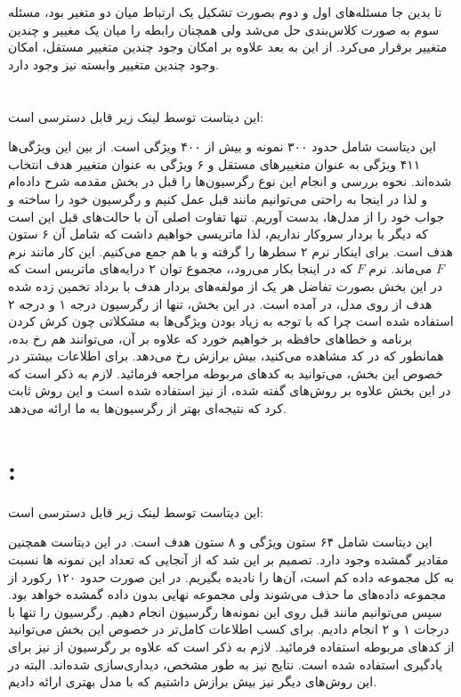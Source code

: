 \documentclass[a4paper, 12pt]{article}
\begin{document}
تا بدین جا مسئله‌های اول و دوم بصورت تشکیل یک ارتباط میان دو متغیر بود، مسئله سوم به صورت کلاس‌بندی حل می‌شد ولی همچنان رابطه را میان یک مغییر و چندین متغییر برقرار می‌کرد.  از این به بعد علاوه بر امکان وجود چندین متغییر مستقل، امکان وجود چندین متغییر وابسته نیز وجود دارد. 


\section{}
این دیتاست توسط لینک زیر قابل دسترسی است:
\begin{center}
	\href{https://www.kaggle.com/datasets/samanemami/airline-ticket-price-dataset-atp1d}{}
\end{center}

این دیتاست شامل حدود ۳۰۰ نمونه و بیش از ۴۰۰ ویژگی است. از بین این ویژگی‌ها ۴۱۱ ویژگی به عنوان متغییرهای مستقل و ۶ ویژگی به عنوان متغییر هدف انتخاب شده‌اند. 
نحوه بررسی و انجام این نوع رگرسیون‌ها را قبل در بخش مقدمه شرح داده‌ام و لذا در اینجا به راحتی می‌توانیم مانند قبل عمل کنیم و رگرسیون خود را ساخته و جواب خود را از مدل‌ها، بدست آوریم. تنها تفاوت اصلی آن با حالت‌های قبل این است که دیگر با بردار سروکار نداریم، لذا ماتریسی خواهیم داشت که شامل آن ۶ ستون هدف است. برای اینکار نرم ۲ سطر‌ها را گرفته و با هم جمع می‌کنیم. این کار مانند نرم
$F$
می‌ماند. نرم 
$F$
که در اینجا بکار می‌رود،، مجموع توان ۲ درایه‌های ماتریس است که در این بخش بصورت تفاضل هر یک از مولفه‌های بردار هدف با برداد تخمین زده شده هدف از روی مدل، در آمده است.
در این بخش، تنها از رگرسیون درجه ۱ و درجه ۲ استفاده شده است چرا که با توجه به زیاد بودن ویژگی‌ها به مشکلاتی چون کرش کردن برنامه و خطا‌های حافظه بر خواهیم خورد که علاوه بر آن، می‌توانند 
هم رخ بده، همانطور که در کد مشاهده می‌کنید، بیش برازش رخ می‌دهد. برای اطلاعات بیشتر در خصوص این بخش، می‌توانید به کد‌های مربوطه مراجعه فرمائید. لازم به ذکر است که در این بخش علاوه بر روش‌های گفته شده، از 
نیز استفاده شده است و این روش ثابت کرد که نتیجه‌ای بهتر از رگرسیون‌ها به ما ارائه می‌دهد.

\section{ : }
این دیتاست توسط لینک زیر قابل دسترسی است:
\begin{center}
	\href{https://www.kaggle.com/datasets/samanemami/river-flowrf1}{}
\end{center}
این دیتاست شامل ۶۴ ستون ویژگی و ۸ ستون هدف است. در این دیتاست همچنین مقادیر گمشده وجود دارد. تصمیم بر این شد که از آنجایی که تعداد این نمونه ها نسبت به کل مجموعه داده کم است، آن‌ها را نادیده بگیریم. در  این صورت حدود ۱۲۰ رکورد از مجموعه داده‌های ما حذف می‌شوند ولی مجموعه نهایی بدون داده گمشده خواهد بود. سپس می‌توانیم مانند قبل روی این نمونه‌ها رگرسیون انجام دهیم. رگرسیون را تنها با درجات ۱ و ۲ انجام دادیم. برای کسب اطلاعات کامل‌تر در خصوص این بخش  می‌توانید از کد‌های مربوطه استفاده فرمائید. لازم به ذکر است که علاوه بر رگرسیون از 
نیز برای یادگیری استفاده شده است. نتایج نیز به طور مشخص، دیداری‌سازی شده‌اند.  البته در این روش‌های دیگر نیز بیش برازش داشتیم که با 
مدل بهتری ارائه دادیم.
\end{document}
